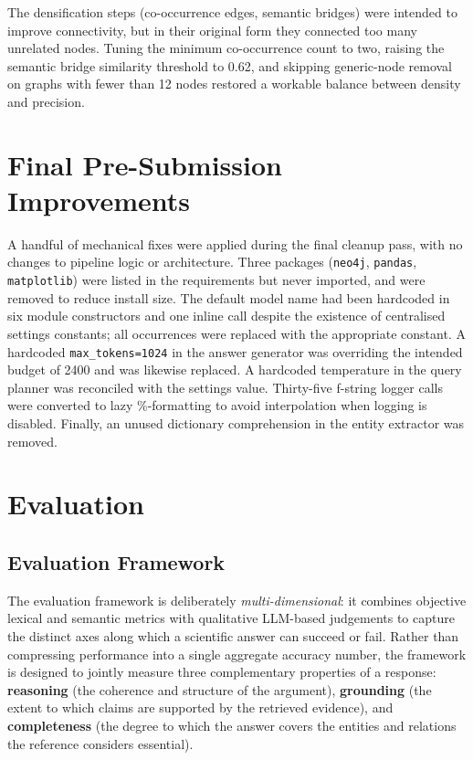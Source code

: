 \documentclass[11pt,a4paper]{article}
\begin{document}
The densification steps (co-occurrence edges, semantic bridges) were intended
to improve connectivity, but in their original form they connected too many
unrelated nodes. Tuning the minimum co-occurrence count to two, raising the
semantic bridge similarity threshold to 0.62, and skipping generic-node
removal on graphs with fewer than 12 nodes restored a workable balance
between density and precision.

\section{Final Pre-Submission Improvements}

A handful of mechanical fixes were applied during the final cleanup pass,
with no changes to pipeline logic or architecture. Three packages
(\texttt{neo4j}, \texttt{pandas}, \texttt{matplotlib}) were listed in the
requirements but never imported, and were removed to reduce install size.
The default model name had been hardcoded in six module constructors and one
inline call despite the existence of centralised settings constants; all
occurrences were replaced with the appropriate constant. A hardcoded
\texttt{max\_tokens=1024} in the answer generator was overriding the
intended budget of 2400 and was likewise replaced. A hardcoded temperature
in the query planner was reconciled with the settings value. Thirty-five
f-string logger calls were converted to lazy \%-formatting to avoid
interpolation when logging is disabled. Finally, an unused dictionary
comprehension in the entity extractor was removed.

\section{Evaluation}
\label{sec:evaluation}

\subsection{Evaluation Framework}

The evaluation framework is deliberately \emph{multi-dimensional}: it combines
objective lexical and semantic metrics with qualitative LLM-based judgements
to capture the distinct axes along which a scientific answer can succeed or
fail. Rather than compressing performance into a single aggregate accuracy
number, the framework is designed to jointly measure three complementary
properties of a response: \textbf{reasoning} (the coherence and structure of
the argument), \textbf{grounding} (the extent to which claims are supported
by the retrieved evidence), and \textbf{completeness} (the degree to which
the answer covers the entities and relations the reference considers
essential).
\end{document}
